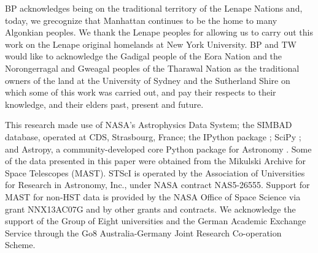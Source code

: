 \documentclass[a4paper,fleqn,usenatbib]{mnras}
\begin{document}
BP acknowledges being on the traditional territory of the Lenape Nations and, today, we grecognize that Manhattan continues to be the home to many Algonkian peoples. We thank the Lenape peoples for allowing us to carry out this work on the Lenape original homelands at New York University. BP and TW would like to acknowledge the Gadigal people of the Eora Nation and the Norongerragal and Gweagal peoples of the Tharawal Nation as the traditional owners of the land at the University of Sydney and the Sutherland Shire on which some of this work was carried out, and pay their respects to their knowledge, and their elders past, present and future.

This research made use of NASA's Astrophysics Data System; the SIMBAD database, operated at CDS, Strasbourg, France; the IPython package \citep{PER-GRA:2007}; SciPy \citep{jones_scipy_2001}; and Astropy, a community-developed core Python package for Astronomy \citep{2013A&A...558A..33A}. Some of the data presented in this paper were obtained from the Mikulski Archive for Space Telescopes (MAST). STScI is operated by the Association of Universities for Research in Astronomy, Inc., under NASA contract NAS5-26555. Support for MAST for non-HST data is provided by the NASA Office of Space Science via grant NNX13AC07G and by other grants and contracts. We acknowledge the support of the Group of Eight universities and the German Academic Exchange Service through the Go8 Australia-Germany Joint Research Co-operation Scheme. 















\bsp	%
\label{lastpage}
\end{document}
